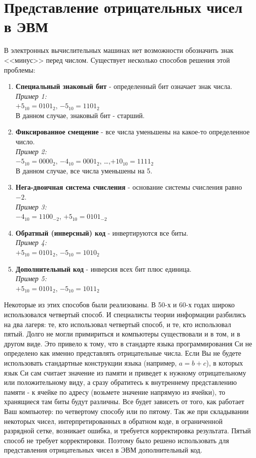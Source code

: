\section{Представление отрицательных чисел в ЭВМ}

В электронных вычислительных машинах нет возможности обозначить знак <<минус>> перед числом. Существует несколько способов решения этой проблемы:
\begin{enumerate}
\item \textbf{Специальный знаковый бит} - определенный бит означает знак числа.
\\\emph{Пример 1:}
\\$+5_{10} = 0101_{2}$, $-5_{10} = 1101_{2}$
\\В данном случае, знаковый бит - старший.
\item \textbf{Фиксированное смещение} - все числа уменьшены на какое-то определенное число.
\\\emph{Пример 2:}
\\$-5_{10} = 0000_{2}$, $-4_{10} = 0001_{2}$, \dots ,$+10_{10} = 1111_{2}$
\\В данном случае, все числа уменьшены на 5.
\item \textbf{Нега-двоичная система счисления} - основание системы счисления равно $-2$.
\\\emph{Пример 3:}
\\$-4_{10} = 1100_{-2}$, $+5_{10} = 0101_{-2}$
\item \textbf{Обратный (инверсный) код} - инвертируются все биты.
\\\emph{Пример 4:}
\\$+5_{10} = 0101_{2}$, $-5_{10} = 1010_{2}$
\item \textbf{Дополнительный код} - инверсия всех бит плюс единица.
\\\emph{Пример 5:}
\\$+5_{10} = 0101_{2}$, $-5_{10} = 1011_{2}$
\end{enumerate}

Некоторые из этих способов были реализованы. В 50-х и 60-х годах широко использовался четвертый способ. И специалисты теории информации разбились на два лагеря: те, кто использовал четвертый способ, и те, кто использовал пятый. Долго не могли примириться и компьютеры существовали и в том, и в другом виде. Это привело к тому, что в стандарте языка программирования Си не определено как именно представлять отрицательные числа. Если Вы не будете использовать стандартные конструкции языка (например, $a = b + c$), в которых язык Си сам считает значение из памяти и приведет к нужному отрицательному или положительному виду, а сразу обратитесь к внутреннему представлению памяти - к ячейке по адресу (возьмете значение напрямую из ячейки), то хранящиеся там биты будут различны. Все будет зависеть от того, как работает Ваш компьютер: по четвертому способу или по пятому. Так же при складывании некоторых чисел, интерпретированных в обратном коде, в ограниченной разрядной сетке, возникает ошибка, и требуется корректировка результата. Пятый способ не требует корректировки. Поэтому было решено использовать для представления отрицательных чисел в ЭВМ дополнительный код.

